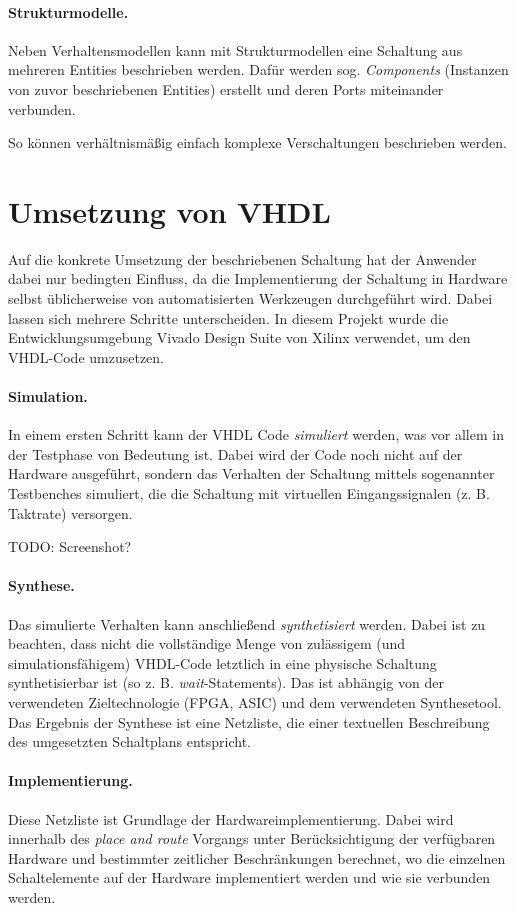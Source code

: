 \paragraph{Strukturmodelle.} Neben Verhaltensmodellen kann mit Strukturmodellen eine Schaltung aus mehreren Entities beschrieben werden. Dafür werden sog. \textit{Components} (Instanzen von zuvor beschriebenen Entities) erstellt und deren Ports miteinander verbunden.

So können verhältnismäßig einfach komplexe Verschaltungen beschrieben werden.
 
\section{Umsetzung von VHDL}
Auf die konkrete Umsetzung der beschriebenen Schaltung hat der Anwender dabei nur bedingten Einfluss, da die Implementierung der Schaltung in Hardware selbst üblicherweise von automatisierten Werkzeugen durchgeführt wird. Dabei lassen sich mehrere Schritte unterscheiden. In diesem Projekt wurde die Entwicklungsumgebung Vivado Design Suite von Xilinx verwendet, um den VHDL-Code umzusetzen.

\paragraph{Simulation.} In einem ersten Schritt kann der VHDL Code \emph{simuliert} werden, was vor allem in der Testphase von Bedeutung ist. Dabei wird der Code noch nicht auf der Hardware ausgeführt, sondern das Verhalten der Schaltung mittels sogenannter Testbenches simuliert, die die Schaltung mit virtuellen Eingangssignalen (z. B. Taktrate) versorgen. 

TODO: Screenshot?

\paragraph{Synthese.} Das simulierte Verhalten kann anschließend \emph{synthetisiert} werden. Dabei ist zu beachten, dass nicht die vollständige Menge von zulässigem (und simulationsfähigem) VHDL-Code letztlich in eine physische Schaltung synthetisierbar ist (so z. B. \emph{wait}-Statements). Das ist abhängig von der verwendeten Zieltechnologie (FPGA, ASIC) und dem verwendeten Synthesetool. Das Ergebnis der Synthese ist eine Netzliste, die einer textuellen Beschreibung des umgesetzten Schaltplans entspricht.

\paragraph{Implementierung.} Diese Netzliste ist Grundlage der Hardwareimplementierung. Dabei wird innerhalb des \emph{place and route} Vorgangs unter Berücksichtigung der verfügbaren Hardware und bestimmter zeitlicher Beschränkungen berechnet, wo die einzelnen Schaltelemente auf der Hardware implementiert werden und wie sie verbunden werden.
